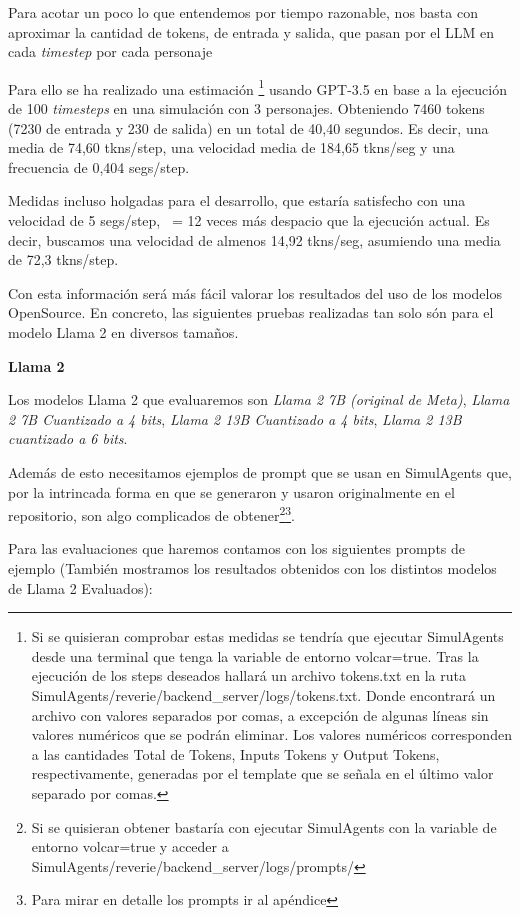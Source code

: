 Para acotar un poco lo que entendemos por tiempo razonable, nos basta con aproximar la cantidad de tokens, de entrada y salida, que pasan por el LLM en cada \textit{timestep} por cada personaje

Para ello se ha realizado una estimación \footnote{Si se quisieran comprobar estas medidas se tendría que ejecutar SimulAgents desde una terminal que tenga la variable de entorno volcar=true. Tras la ejecución de los steps deseados hallará un archivo tokens.txt en la ruta SimulAgents/reverie/backend\_server/logs/tokens.txt. Donde encontrará un archivo con valores separados por comas, a excepción de algunas líneas sin valores numéricos que se podrán eliminar. Los valores numéricos corresponden a las cantidades Total de Tokens, Inputs Tokens y Output Tokens, respectivamente, generadas por el template que se señala en el último valor separado por comas.} usando GPT-3.5 en base a la ejecución de 100 \textit{timesteps} en una simulación con 3 personajes. Obteniendo 7460 tokens (7230 de entrada y 230 de salida) en un total de 40,40 segundos. Es decir, una media de 74,60 tkns/step, una velocidad media de 184,65 tkns/seg y una frecuencia de 0,404 segs/step.

Medidas incluso holgadas para el desarrollo, que estaría satisfecho con una velocidad de 5 segs/step, ~= 12 veces más despacio que la ejecución actual. Es decir, buscamos una velocidad de almenos 14,92 tkns/seg, asumiendo una media de 72,3 tkns/step.

Con esta información será más fácil valorar los resultados del uso de los modelos OpenSource. En concreto, las siguientes pruebas realizadas tan solo són para el modelo Llama 2 en diversos tamaños.

\textbf{Llama 2}

Los modelos Llama 2 que evaluaremos son \textit{Llama 2 7B (original de Meta)}, \textit{Llama 2 7B Cuantizado a 4 bits}, \textit{Llama 2 13B Cuantizado a 4 bits}, \textit{Llama 2 13B cuantizado a 6 bits}.

Además de esto necesitamos ejemplos de prompt que se usan en SimulAgents que, por la intrincada forma en que se generaron y usaron originalmente en el repositorio, son algo complicados de obtener\footnote{Si se quisieran obtener bastaría con ejecutar SimulAgents con la variable de entorno volcar=true y acceder a SimulAgents/reverie/backend\_server/logs/prompts/}\footnote{Para mirar en detalle los prompts ir al apéndice}.

Para las evaluaciones que haremos contamos con los siguientes prompts de ejemplo (También mostramos los resultados obtenidos con los distintos modelos de Llama 2 Evaluados):


